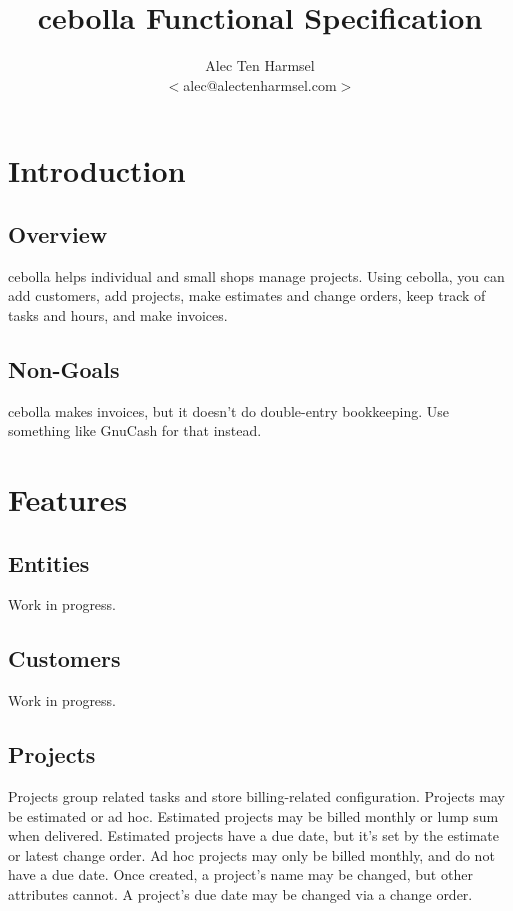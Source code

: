 \documentclass{book}
\begin{document}
\title{cebolla Functional Specification}
\author{
    Alec Ten Harmsel\\
    $<$alec@alectenharmsel.com$>$
}
\date{}
\maketitle

\chapter{Introduction}

\section{Overview}

cebolla helps individual and small shops manage projects.
Using cebolla, you can add customers, add projects, make estimates and change
orders, keep track of tasks and hours, and make invoices.

\section{Non-Goals}

cebolla makes invoices, but it doesn't do double-entry bookkeeping.
Use something like GnuCash for that instead.

\chapter{Features}

\section{Entities}

Work in progress.

\section{Customers}

Work in progress.

\section{Projects}

Projects group related tasks and store billing-related configuration.
Projects may be estimated or ad hoc.
Estimated projects may be billed monthly or lump sum when delivered.
Estimated projects have a due date, but it's set by the estimate or latest
change order.
Ad hoc projects may only be billed monthly, and do not have a due date.
Once created, a project's name may be changed, but other attributes cannot.
A project's due date may be changed via a change order.
\end{document}
